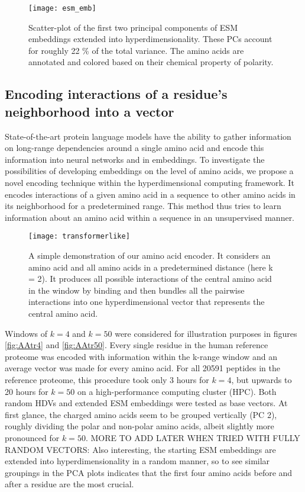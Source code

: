\begin{figure}[H]
    \centering
    \texttt{[image: esm\_emb]}
    \caption{Scatter-plot of the first two principal components of ESM embeddings extended into hyperdimensionality. These PCs account for roughly 22 \% of the total variance. The amino acids are annotated and colored based on their chemical property of polarity.}\label{fig:AAesm}
\end{figure}

\subsection*{Encoding interactions of a residue's neighborhood into a vector}
State-of-the-art protein language models have the ability to gather information on long-range dependencies around a single amino acid and encode this information into neural networks and in embeddings. To investigate the possibilities of developing embeddings on the level of amino acids, we propose a novel encoding technique within the hyperdimensional computing framework. It encodes interactions of a given amino acid in a sequence to other amino acids in its neighborhood for a predetermined range. This method thus tries to learn information about an amino acid within a sequence in an unsupervised manner.
\begin{figure}[H]
    \centering
    \texttt{[image: transformerlike]}
    \caption{A simple demonstration of our amino acid encoder. It considers an amino acid and all amino acids in a predetermined distance (here k = 2). It produces all possible interactions of the central amino acid in the window by binding and then bundles all the pairwise interactions into one hyperdimensional vector that represents the central amino acid.}
    \label{fig:AAtr}
\end{figure}

Windows of $k = 4$ and $k = 50$ were considered for illustration purposes in figures \ref{fig:AAtr4} and \ref{fig:AAtr50}. Every single residue in the human reference proteome was encoded with information within the k-range window and an average vector was made for every amino acid. For all 20591 peptides in the reference proteome, this procedure took only 3 hours for $k = 4$, but upwards to 20 hours for $k = 50$ on a high-performance computing cluster (HPC). Both random HDVs and extended ESM embeddings were tested as base vectors. At first glance, the charged amino acids seem to be grouped vertically (PC 2), roughly dividing the polar and non-polar amino acids, albeit slightly more pronounced for $k = 50$. MORE TO ADD LATER WHEN TRIED WITH FULLY RANDOM VECTORS: Also interesting, the starting ESM embeddings are extended into hyperdimensionality in a random manner, so to see similar groupings in the PCA plots indicates that the first four amino acids before and after a residue are the most crucial.

